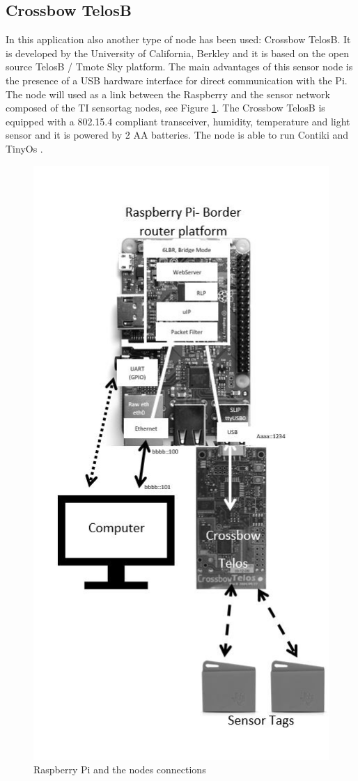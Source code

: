 \subsection{Crossbow TelosB}
In this application also another type of node has been used: Crossbow TelosB. It is developed by the University of California, Berkley and it is based on the open source TelosB / Tmote Sky platform. 
The main advantages of this sensor node is the presence of a USB hardware interface for direct communication with the Pi. The node will used as a link between the Raspberry and the sensor network composed of the TI sensortag nodes, see Figure \ref{fig:Architecture}.
The Crossbow TelosB is equipped with a 802.15.4 compliant transceiver, humidity, temperature and light sensor and it is powered by 2 AA batteries. The node is able to run Contiki and TinyOs \cite{TB}.\\
\begin{figure}[!h]
	\includegraphics[width=\linewidth]{Architecture}
	\caption{Raspberry Pi and the nodes connections}
	\label{fig:Architecture}
\end{figure}



